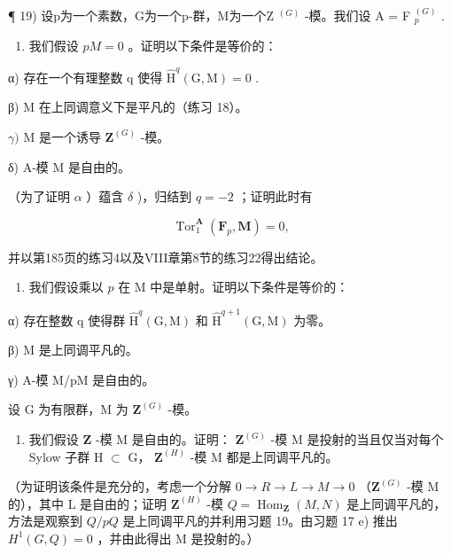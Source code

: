 ¶ 19) 设p为一个素数，G为一个p-群，M为一个Z \(^{(G)}\) -模。我们设 A = F \(_{p}^{(G)}\) .

\begin{enumerate}
\def\labelenumi{\alph{enumi})}
\tightlist
\item
  我们假设 \(pM = 0\) 。证明以下条件是等价的：
\end{enumerate}

α) 存在一个有理整数 q 使得 \(\hat{\mathrm{H}}^{q}(\mathrm{G},\mathrm{M})=0\) .

β) M 在上同调意义下是平凡的（练习 18）。

\(\gamma)\) M 是一个诱导 \(\mathbf{Z}^{(G)}\) -模。

δ) A-模 M 是自由的。

（为了证明 \(\alpha\) ）蕴含 \(\delta\) )，归结到 \(q = -2\) ；证明此时有

\[
\operatorname{Tor} _ {1} ^ {\mathbf {A}} \left(\mathbf {F} _ {p}, \mathbf {M}\right) = 0,
\]

并以第185页的练习4以及VIII章第8节的练习22得出结论。

\begin{enumerate}
\def\labelenumi{\alph{enumi})}
\setcounter{enumi}{1}
\tightlist
\item
  我们假设乘以 \(p\) 在 M 中是单射。证明以下条件是等价的：
\end{enumerate}

α) 存在整数 q 使得群 \(\hat{\mathrm{H}}^{q}(\mathrm{G},\mathrm{M})\) 和 \(\hat{\mathrm{H}}^{q+1}(\mathrm{G},\mathrm{M})\) 为零。

β) M 是上同调平凡的。

γ) A-模 M/pM 是自由的。

设 G 为有限群，M 为 \(\mathbf{Z}^{(G)}\) -模。

\begin{enumerate}
\def\labelenumi{\alph{enumi})}
\tightlist
\item
  我们假设 \(\mathbf{Z}\) -模 M 是自由的。证明： \(\mathbf{Z}^{(G)}\) -模 M 是投射的当且仅当对每个 Sylow 子群 H \(\subset\) G， \(\mathbf{Z}^{(H)}\) -模 M 都是上同调平凡的。
\end{enumerate}

（为证明该条件是充分的，考虑一个分解 \(0 \to R \to L \to M \to 0\) （\(\mathbf{Z}^{(G)}\) -模 M 的），其中 L 是自由的；证明 \(\mathbf{Z}^{(H)}\) -模 \(Q = \operatorname{Hom}_{\mathbf{Z}}(M, N)\) 是上同调平凡的，方法是观察到 \(Q/pQ\) 是上同调平凡的并利用习题 19。由习题 17 e) 推出 \(H^1(G, Q) = 0\) ，并由此得出 M 是投射的。）

